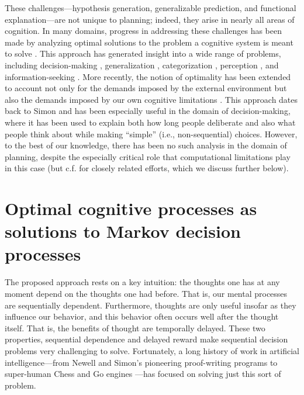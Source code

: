 These challenges---hypothesis generation, generalizable prediction, and functional explanation---are not unique to planning; indeed, they arise in nearly all areas of cognition. In many domains, progress in addressing these challenges has been made by analyzing optimal solutions to the problem a cognitive system is meant to solve \citep{marr1982vision,anderson1990adaptive}. This approach has generated insight into a wide range of problems, including decision-making \citep{savage1954foundations}, generalization \citep{tenenbaum2001generalization}, categorization \citep{anderson1991adaptive,ashby1995categorization}, perception \citep{knill1996perception}, and information-seeking \citep{oaksford1994rational,gureckis2012selfdirected}. More recently, the notion of optimality has been extended to account not only for the demands imposed by the external environment but also the demands imposed by our own cognitive limitations \citep{howes2009rational,lewis2014computational,gershman2015computational,griffiths2015rational,lieder2020resourcerational}. This approach dates back to Simon \citep{simon1955behavioral} and has been especially useful in the domain of decision-making, where it has been used to explain both how long people deliberate \citep{bogacz2006physics,drugowitsch2012cost,tajima2016optimal,tajima2019optimal,fudenberg2018speed} and also what people think about \citep{callaway2021fixation,jang2021optimal} while making ``simple'' (i.e., non-sequential) choices. However, to the best of our knowledge, there has been no such analysis in the domain of planning, despite the especially critical role that computational limitations play in this case (but c.f. \citep{sezener2019optimizing,mattar2018prioritized} for closely related efforts, which we discuss further below).



\section{Optimal cognitive processes as solutions to Markov decision processes}

The proposed approach rests on a key intuition: the thoughts one has at any moment depend on the thoughts one had before. That is, our mental processes are sequentially dependent. Furthermore, thoughts are only useful insofar as they influence our behavior, and this behavior often occurs well after the thought itself. That is, the benefits of thought are temporally delayed. These two properties, sequential dependence and delayed reward make sequential decision problems very challenging to solve. Fortunately, a long history of work in artificial intelligence---from Newell and Simon's pioneering proof-writing programs \citep{newell1956logic} to super-human Chess and Go engines \citep{silver2017mastering}---has focused on solving just this sort of problem.

